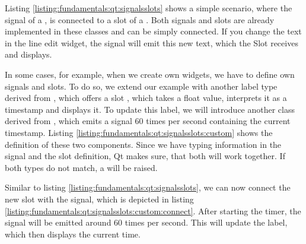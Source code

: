 Listing \ref{listing:fundamentals:qt:signalsslots} shows a simple scenario,
where the signal of a , is connected to
a slot of a . Both signals and slots are
already implemented in these classes and can be simply connected. If you change
the text in the line edit widget, the signal 
will emit this new text, which the Slot  receives
and displays.



In some cases, for example, when we create own widgets, we have to define own
signals and slots. To do so, we extend our example with another label type
 derived from
, which offers a slot
, which takes a float value, interprets it as a
timestamp and displays it. To update this label, we will introduce another class
 derived from ,
which emits a signal 60 times per second containing the current timestamp.
Listing \ref{listing:fundamentals:qt:signalsslots:custom} shows the definition
of these two components. Since we have typing information in the signal and the
slot definition, Qt makes sure, that both will work together. If both types do
not match, a  will be raised.



Similar to listing \ref{listing:fundamentals:qt:signalsslots}, we can now
connect the new slot with the signal, which is depicted in listing
\ref{listing:fundamentals:qt:signalsslots:custom:connect}. After starting the
timer, the signal will be emitted around 60 times per second. This will update
the label, which then displays the current time.



